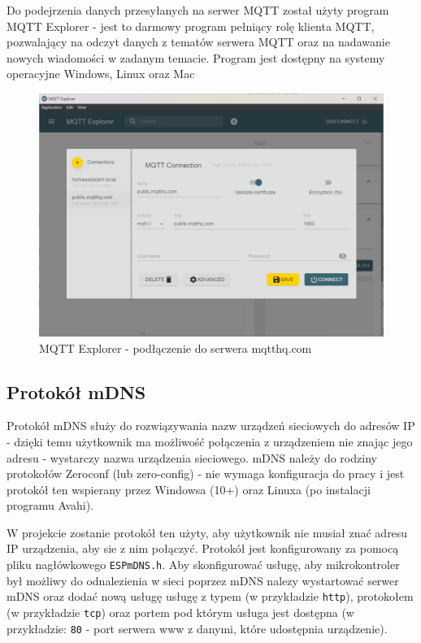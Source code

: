 \documentclass[12pt,a4paper]{article}
\begin{document}
Do podejrzenia danych przesyłanych na serwer MQTT został użyty program MQTT Explorer\cite{mqtt-explorer} - jest to darmowy program pełniący rolę klienta MQTT, pozwalający na odczyt
danych z tematów serwera MQTT oraz na nadawanie nowych wiadomości w zadanym temacie. Program jest dostępny na systemy operacyjne Windows, Linux oraz Mac

\begin{figure}[H]
    \centering
    \includegraphics[width=\textwidth]{mqtt-explorer.png}
    \caption{MQTT Explorer - podłączenie do serwera mqtthq.com}
\end{figure}

\subsection{Protokół mDNS}

Protokół mDNS służy do rozwiązywania nazw urządzeń sieciowych do adresów IP - dzięki temu użytkownik ma możliwość połączenia z urządzeniem nie znając
jego adresu - wystarczy nazwa urządzenia sieciowego. mDNS należy do rodziny protokołów Zeroconf (lub zero-config)\cite{zeroconf-explanation} - nie wymaga konfiguracja do pracy 
i jest protokół ten wspierany przez Windowsa (10+) oraz Linuxa (po instalacji programu Avahi).

W projekcie zostanie protokół ten użyty, aby użytkownik nie musiał znać adresu IP urządzenia, aby sie z nim połączyć. 
Protokół jest konfigurowany za pomocą pliku nagłówkowego \texttt{ESPmDNS.h}. Aby skonfigurować usługę, aby mikrokontroler był możliwy do odnalezienia
w sieci poprzez mDNS nalezy wystartować serwer mDNS oraz dodać nową usługę usługę z typem (w przykładzie \texttt{http}), protokołem (w przykładzie \texttt{tcp}) 
oraz portem pod którym usługa jest dostępna (w przykładzie: \texttt{80} - port serwera www z danymi, które udostępnia urządzenie).
\end{document}
